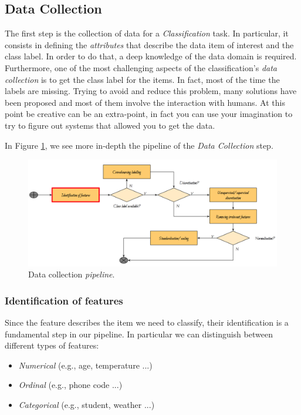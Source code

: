 \subsection{Data Collection}

The first step is the collection of data for a \emph{Classification} task. In particular, it consists in defining the \emph{attributes} that describe the data item of interest and the class label. In order to do that, a deep knowledge of the data domain is required. Furthermore, one of the most challenging aspects of the classification's \emph{data collection} is to get the class label for the items. In fact, most of the time the labels are missing. Trying to avoid and reduce this problem, many solutions have been proposed and most of them involve the interaction with humans. At this point be creative can be an extra-point, in fact you can use your imagination to try to figure out systems that allowed you to get the data.

In Figure \ref{pic:data_collection_pipeline}, we see more in-depth the pipeline of the \emph{Data Collection} step. 

\begin{figure}[H]%
 \centering
 \includegraphics[width=13cm]{./img/08/data_collection_pipeline}
 \caption{\label{pic:data_collection_pipeline} Data collection \emph{pipeline}.}
\end{figure}

\subsubsection{Identification of features}

Since the feature describes the item we need to classify, their identification is a fundamental step in our pipeline. In particular we can distinguish between different types of features:
\begin{itemize}
\item \emph{Numerical} (e.g., age, temperature ...)
\item \emph{Ordinal} (e.g., phone code ...)
\item \emph{Categorical} (e.g., student, weather ...)
\end{itemize}

